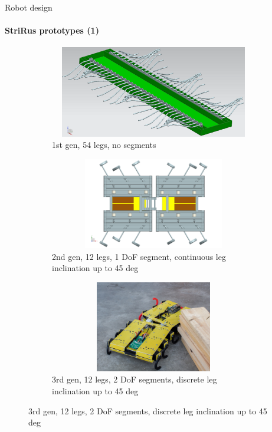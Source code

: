\documentclass[aspectratio=169]{beamer}
\begin{document}
\begin{frame}[t]{Robot design}
    \framesubtitle{StriRus prototypes (1)}
    \vspace{-0.5cm}
    \begin{figure}[H]
        \begin{subfigure}{0.32\textwidth}
            \centering\includegraphics[height=4cm,width=1\textwidth,keepaspectratio]{strirus_0.png}
            \caption*{1st gen, 54 legs, no segments}
        \end{subfigure}
        \hfill
        \begin{subfigure}{0.32\textwidth}
            \centering\includegraphics[height=4cm,width=1\textwidth,keepaspectratio]{strirus_1.png}
            \caption*{2nd gen, 12 legs, 1 DoF segment, continuous leg inclination up to 45 deg}
        \end{subfigure}
        \hfill
        \begin{subfigure}{0.32\textwidth}
            \centering\includegraphics[height=4cm,width=1\textwidth,keepaspectratio]{strirus_2.jpg}
            \caption*{3rd gen, 12 legs, 2 DoF segments, discrete leg inclination up to 45 deg}
        \end{subfigure}
        \hfill
    \end{figure}
\end{frame}
\end{document}
